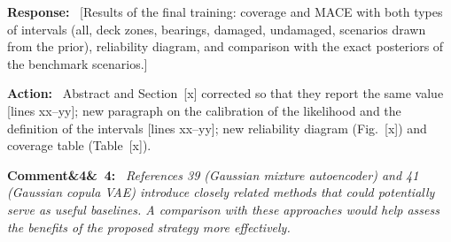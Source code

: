 \documentclass[11pt]{article}
\newenvironment{rcomment}[1]{\par\bigskip\noindent\textbf{Comment\ifx&#1&\else\ #1\fi:}\ \itshape}{\par}
\newenvironment{response}{\par\smallskip\noindent\color{resp}\textbf{Response:}\ }{\par}
\newenvironment{action}{\par\smallskip\noindent\color{resp}\textbf{Action:}\ }{\par}
\newcommand{\tbd}[1]{\textcolor{note}{\textsf{[#1]}}}
\newcommand{\lines}[1]{\tbd{lines #1}}
\begin{document}
\begin{response}
\tbd{Results of the final training: coverage and MACE with both types of intervals (all, deck zones, bearings,
damaged, undamaged, scenarios drawn from the prior), reliability diagram, and comparison with the exact posteriors of
the benchmark scenarios.}
\end{response}

\begin{action}
Abstract and Section~\tbd{x} corrected so that they report the same value \lines{xx--yy}; new paragraph on the
calibration of the likelihood and the definition of the intervals \lines{xx--yy}; new reliability diagram (Fig.~\tbd{x})
and coverage table (Table~\tbd{x}).
\end{action}

\begin{rcomment}{4}
References 39 (Gaussian mixture autoencoder) and 41 (Gaussian copula VAE) introduce closely related methods that could
potentially serve as useful baselines. A comparison with these approaches would help assess the benefits of the proposed
strategy more effectively.
\end{rcomment}
\end{document}
